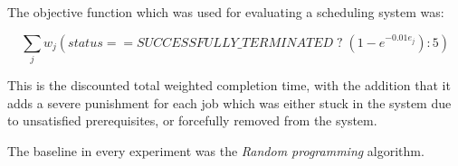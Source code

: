 The objective function which was used for evaluating a scheduling system was:

$$ \sum_{j} w_j (status == SUCCESSFULLY\_TERMINATED \; ? \; (1 - e^{-0.01 e_j}) : 5) $$

This is the discounted total weighted completion time, with the addition that it adds a severe punishment for each job which was either stuck in the system due to unsatisfied prerequisites, or forcefully removed from the system.

The baseline in every experiment was the \textit{Random programming} algorithm.